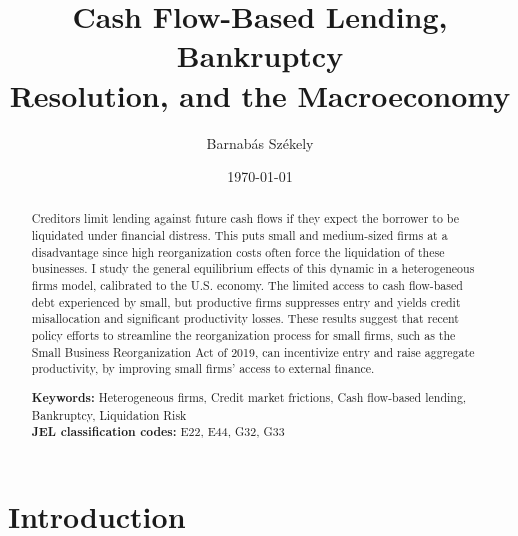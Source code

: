 \documentclass[12pt]{article}
\title{Cash Flow-Based Lending, Bankruptcy\\ Resolution, and the Macroeconomy}
\date{}
\begin{document}
\author{Barnabás Székely\textsuperscript{\dag}}
\renewcommand{\thefootnote}{}
\renewcommand{\thefootnote}{\arabic{footnote}}

\date{\today}
\vspace{-1in}

\maketitle

\begin{abstract}
\noindent

Creditors limit lending against future cash flows if they expect the borrower to be liquidated under financial distress. This puts small and medium-sized firms at a disadvantage since high reorganization costs often force the liquidation of these businesses. I study the general equilibrium effects of this dynamic in a heterogeneous firms model, calibrated to the U.S. economy. The limited access to cash flow-based debt experienced by small, but productive firms suppresses entry and yields credit misallocation and significant productivity losses. These results suggest that recent policy efforts to streamline the reorganization process for small firms, such as the Small Business Reorganization Act of 2019, can incentivize entry and raise aggregate productivity, by improving small firms' access to external finance.

\bigskip{}
\bigskip{}

\noindent \textbf{Keywords:} Heterogeneous firms, Credit market frictions, Cash flow-based lending, Bankruptcy, Liquidation Risk \vspace{3mm} \\
\medskip{}
\textbf{JEL classification codes:} E22, E44, G32, G33

\end{abstract}
\thispagestyle{empty}

\pagebreak{}


\section{Introduction \label{sec:introduction}} 
\end{document}
